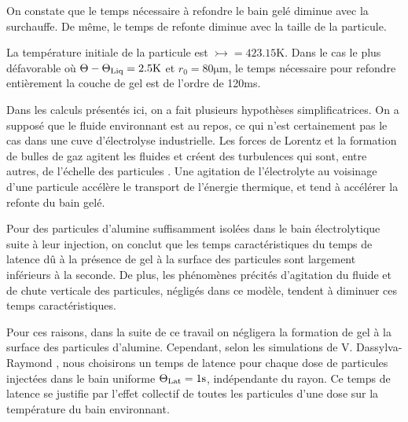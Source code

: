 On constate que le temps nécessaire à refondre le bain gelé
diminue avec la surchauffe. De même, le temps de refonte diminue avec
la taille de la particule.

La température initiale de la particule est $\tinj =
423.15\si{\kelvin}$. Dans le cas le plus défavorable où $\Theta -
\Theta_\text{Liq} = 2.5\si{\kelvin}$ et $r_0 = 80\si{\micro\meter}$, le
temps nécessaire pour refondre entièrement la couche de gel est de
l'ordre de 120\si{\milli\second}.

Dans les calculs présentés ici, on a fait plusieurs hypothèses
simplificatrices. On a supposé que le fluide environnant est au
repos, ce qui n'est certainement pas le cas dans une cuve
d'électrolyse industrielle. Les forces de Lorentz et la formation de
bulles de gaz agitent les fluides et créent des turbulences qui sont,
entre autres, de l'échelle des particules \cite{Rochat2016}. Une
agitation de l'électrolyte au voisinage d'une particule accélère le
transport de l'énergie thermique, et tend à accélérer la refonte du
bain gelé.


Pour des particules d'alumine suffisamment isolées dans le bain
électrolytique suite à leur injection, on conclut que les temps
caractéristiques du temps de latence dû à la présence de gel à
la surface des particules sont largement inférieurs à la seconde. De
plus, les phénomènes précités d'agitation du fluide et de
chute verticale des particules, négligés dans ce modèle, tendent à
diminuer ces temps caractéristiques.

Pour ces raisons, dans la suite de ce travail on négligera la
formation de gel à la surface des particules d'alumine. Cependant,
selon les simulations de V. Dassylva-Raymond \cite{Dassylva2015}, nous
choisirons un temps de latence pour chaque dose de particules
injectées dans le bain uniforme $\Theta_\text{Lat} = 1\si{\second}$, indépendante
du rayon. Ce temps de latence se justifie par l'effet collectif de
toutes les particules d'une dose sur la température du bain
environnant.
